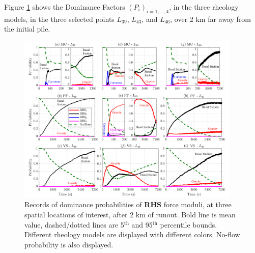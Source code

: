 \documentclass{article}
\begin{document}
Figure \ref{fig:Colima-Pr2} shows the Dominance Factors $(P_i)_{i=1,\dots,4}$, in the three rheology models, in the three selected points $L_{39}$, $L_{43}$, and $L_{46}$, over 2 km far away from the initial pile.
\begin{figure}[H]
         \centering
        \includegraphics[width=0.95\textwidth]{BAF_VolcanDeColima/ForceContrib/Pr2_total.png}
        \caption{Records of dominance probabilities of \textbf{RHS} force moduli, at three spatial locations of interest, after 2 km of runout. Bold line is mean value, dashed/dotted lines are 5$^{\mathrm{th}}$ and 95$^{\mathrm{th}}$ percentile bounds. Different rheology models are displayed with different colors. No-flow probability is also displayed.}
        \label{fig:Colima-Pr2}
\end{figure}
\end{document}
